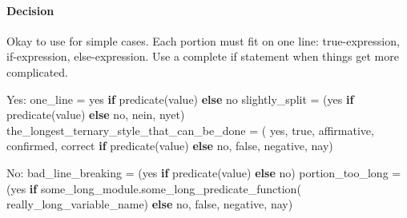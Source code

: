 \documentclass[
]{article}
\newenvironment{Shaded}{}{}
\newcommand{\ControlFlowTok}[1]{\textcolor[rgb]{0.00,0.44,0.13}{\textbf{#1}}}
\newcommand{\NormalTok}[1]{#1}
\newcommand{\OperatorTok}[1]{\textcolor[rgb]{0.40,0.40,0.40}{#1}}
\newcommand{\StringTok}[1]{\textcolor[rgb]{0.25,0.44,0.63}{#1}}
\begin{document}
\paragraph{Decision}

Okay to use for simple cases. Each portion must fit on one line:
true-expression, if-expression, else-expression. Use a complete if
statement when things get more complicated.

\begin{samepage}
\begin{Shaded}
\begin{Highlighting}[]
\NormalTok{Yes:}
\NormalTok{    one\_line }\OperatorTok{=} \StringTok{\textquotesingle{}yes\textquotesingle{}} \ControlFlowTok{if}\NormalTok{ predicate(value) }\ControlFlowTok{else} \StringTok{\textquotesingle{}no\textquotesingle{}}
\NormalTok{    slightly\_split }\OperatorTok{=}\NormalTok{ (}\StringTok{\textquotesingle{}yes\textquotesingle{}} \ControlFlowTok{if}\NormalTok{ predicate(value)}
                      \ControlFlowTok{else} \StringTok{\textquotesingle{}no, nein, nyet\textquotesingle{}}\NormalTok{)}
\NormalTok{    the\_longest\_ternary\_style\_that\_can\_be\_done }\OperatorTok{=}\NormalTok{ (}
        \StringTok{\textquotesingle{}yes, true, affirmative, confirmed, correct\textquotesingle{}}
        \ControlFlowTok{if}\NormalTok{ predicate(value)}
        \ControlFlowTok{else} \StringTok{\textquotesingle{}no, false, negative, nay\textquotesingle{}}\NormalTok{)}
\end{Highlighting}
\end{Shaded}
\end{samepage}

\begin{samepage}
\begin{Shaded}
\begin{Highlighting}[]
\NormalTok{No:}
\NormalTok{    bad\_line\_breaking }\OperatorTok{=}\NormalTok{ (}\StringTok{\textquotesingle{}yes\textquotesingle{}} \ControlFlowTok{if}\NormalTok{ predicate(value) }\ControlFlowTok{else}
                         \StringTok{\textquotesingle{}no\textquotesingle{}}\NormalTok{)}
\NormalTok{    portion\_too\_long }\OperatorTok{=}\NormalTok{ (}\StringTok{\textquotesingle{}yes\textquotesingle{}}
                        \ControlFlowTok{if}\NormalTok{ some\_long\_module.some\_long\_predicate\_function(}
\NormalTok{                            really\_long\_variable\_name)}
                        \ControlFlowTok{else} \StringTok{\textquotesingle{}no, false, negative, nay\textquotesingle{}}\NormalTok{)}
\end{Highlighting}
\end{Shaded}
\end{samepage}
\end{document}

